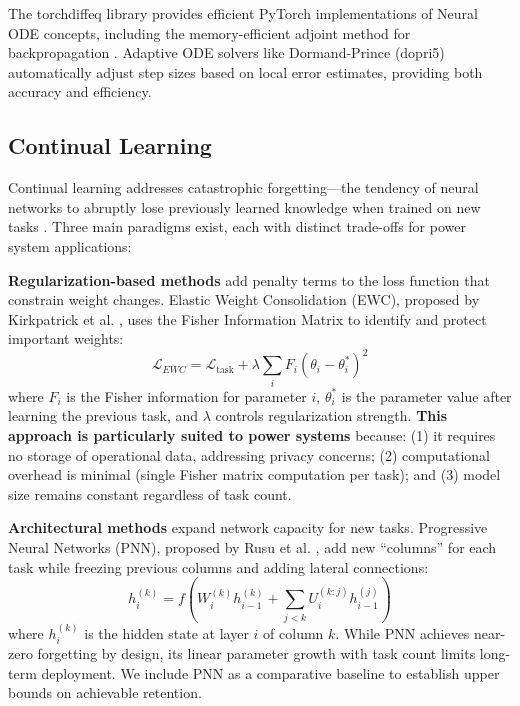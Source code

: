 \documentclass[journal,12pt,onecolumn]{IEEEtran}
\begin{document}
The torchdiffeq library provides efficient PyTorch implementations of Neural ODE concepts, including the memory-efficient adjoint method for backpropagation \cite{ref8}. Adaptive ODE solvers like Dormand-Prince (dopri5) automatically adjust step sizes based on local error estimates, providing both accuracy and efficiency.

\subsection{Continual Learning}

Continual learning addresses catastrophic forgetting—the tendency of neural networks to abruptly lose previously learned knowledge when trained on new tasks \cite{ref4}. Three main paradigms exist, each with distinct trade-offs for power system applications:

\textbf{Regularization-based methods} add penalty terms to the loss function that constrain weight changes. Elastic Weight Consolidation (EWC), proposed by Kirkpatrick et al. \cite{ref9}, uses the Fisher Information Matrix to identify and protect important weights:
\begin{equation}
\mathcal{L}_{EWC} = \mathcal{L}_{\text{task}} + \lambda \sum_i F_i (\theta_i - \theta^*_i)^2
\label{eq:ewc}
\end{equation}
where $F_i$ is the Fisher information for parameter $i$, $\theta^*_i$ is the parameter value after learning the previous task, and $\lambda$ controls regularization strength. \textbf{This approach is particularly suited to power systems} because: (1) it requires no storage of operational data, addressing privacy concerns; (2) computational overhead is minimal (single Fisher matrix computation per task); and (3) model size remains constant regardless of task count.

\textbf{Architectural methods} expand network capacity for new tasks. Progressive Neural Networks (PNN), proposed by Rusu et al. \cite{ref10}, add new ``columns'' for each task while freezing previous columns and adding lateral connections:
\begin{equation}
h^{(k)}_i = f\left(W^{(k)}_i h^{(k)}_{i-1} + \sum_{j<k} U^{(k:j)}_i h^{(j)}_{i-1}\right)
\label{eq:pnn}
\end{equation}
where $h^{(k)}_i$ is the hidden state at layer $i$ of column $k$. While PNN achieves near-zero forgetting by design, its linear parameter growth with task count limits long-term deployment. We include PNN as a comparative baseline to establish upper bounds on achievable retention.
\end{document}
